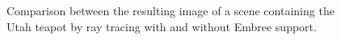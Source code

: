 \begin{figure}[!tbp]
	\centering
	\hfill
	\caption{Comparison between the resulting image of a scene containing the Utah teapot by ray tracing with and without Embree support.}
	\label{fig:teapot}
\end{figure}
